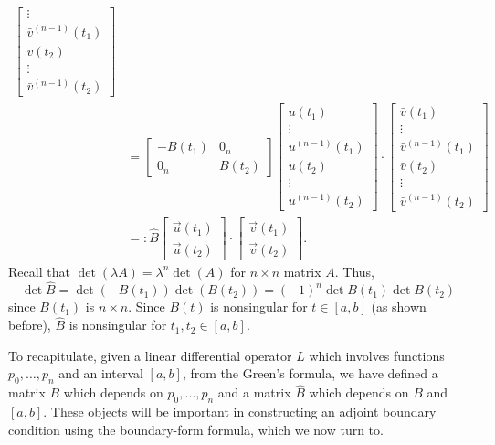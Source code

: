 \documentclass[11pt, oneside, a4paper]{article}
\begin{document}
\begin{equation}
\begin{split}
\begin{bmatrix}
        \vdots\\
        \bar{v}^{(n-1)}(t_1)\\
        \bar{v}(t_2)\\
        \vdots\\
        \bar{v}^{(n-1)}(t_2)
    \end{bmatrix}\\
    &= \begin{bmatrix}
        -B(t_1) & 0_n\\
        0_n & B(t_2)
    \end{bmatrix}
    \begin{bmatrix}
        u(t_1)\\
        \vdots\\
        u^{(n-1)}(t_1)\\
        u(t_2)\\
        \vdots\\
        u^{(n-1)}(t_2)
    \end{bmatrix}\cdot
    \begin{bmatrix}
        \bar{v}(t_1)\\
        \vdots\\
        \bar{v}^{(n-1)}(t_1)\\
        \bar{v}(t_2)\\
        \vdots\\
        \bar{v}^{(n-1)}(t_2)
    \end{bmatrix}\\
    &=:\hat{B}
    \begin{bmatrix}
        \vec{u}(t_1)\\
        \vec{u}(t_2)
    \end{bmatrix}\cdot
    \begin{bmatrix}
        \vec{v}(t_1)\\
        \vec{v}(t_2)
    \end{bmatrix}.
\end{split}
\end{equation}
Recall that $\det(\lambda A) = \lambda^n\det(A)$ for $n\times n$ matrix $A$. Thus,
\[\det\hat{B}= \det(-B(t_1))\det(B(t_2))= (-1)^n\det B(t_1)\det B(t_2)\]
since $B(t_1)$ is $n\times n$. Since $B(t)$ is nonsingular for $t\in [a,b]$ (as shown before), $\hat{B}$ is nonsingular for $t_1, t_2\in [a,b]$.

To recapitulate, given a linear differential operator $L$ which involves functions $p_0,\ldots,p_n$ and an interval $[a,b]$, from the Green's formula, we have defined a matrix $B$ which depends on $p_0,\ldots,p_n$ and a matrix $\hat{B}$ which depends on $B$ and $[a,b]$. These objects will be important in constructing an adjoint boundary condition using the boundary-form formula, which we now turn to.
\end{document}
